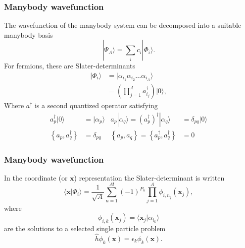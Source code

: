 \documentclass[compress]{beamer}
\newcommand*{\ket}[1]{|#1\rangle}
\newcommand{\op}[1]{\widehat{#1}}
\begin{document}
\begin{frame}[fragile]
    \frametitle{Manybody wavefunction}

    The wavefunction of the manybody system can be decomposed into a suitable manybody basis
    \begin{equation*}
        \ket{\Psi_A} = \sum_{i} c_i \ket{\Phi_i}.
    \end{equation*} 
    For fermions, these are Slater-determinants
    \begin{align*}
        \ket{\Phi_i} &= \ket{ \alpha_{i_1} \alpha_{i_2} \ldots \alpha_{i_A}} \\
        &= \left(\prod_{j=1}^A a^\dagger_{{i_j}} \right)\ket{0},
    \end{align*}
    Where $a^\dagger$ is a second quantized operator satisfying
    \begin{align*}
        a_p^\dagger\ket{0} &= \ket{\alpha_p} 
        & a_p \ket{\alpha_q} = \left(a_p^\dagger \right)^\dagger\ket{\alpha_q} &= \delta_{pq}\ket{0} \\
        \left\{a_p, a_q^\dagger \right\} &= \delta_{pq}
            & \left\{a_p, a_q \right\} = \left\{a_p^\dagger, a_q^\dagger \right\} &= 0
    \end{align*}
\end{frame}
\begin{frame}[fragile]
    \frametitle{Manybody wavefunction}
    In the coordinate (or $\mathbf{x}$) representation the Slater-determinant is written
    \begin{equation*}
       \langle\mathbf{x}|{\Phi_i}\rangle = \frac{1}{\sqrt{A}} \sum_{n=1}^{A!} (-1)^{P_n} \prod_{j=1}^A \phi_{i,n_j}(\mathbf{x}_j),
    \end{equation*}
    where
    \begin{equation*}
        \phi_{i,k} (\mathbf{x}_j) = \langle \mathbf{x}_j|{\alpha_{i_k}}\rangle
    \end{equation*}
    are the solutions to a selected single particle problem
    \begin{equation*}
        \op{h} \phi_k(\mathbf{x}) = \epsilon_k \phi_k(\mathbf{x}).
    \end{equation*}
\end{frame}
\end{document}
